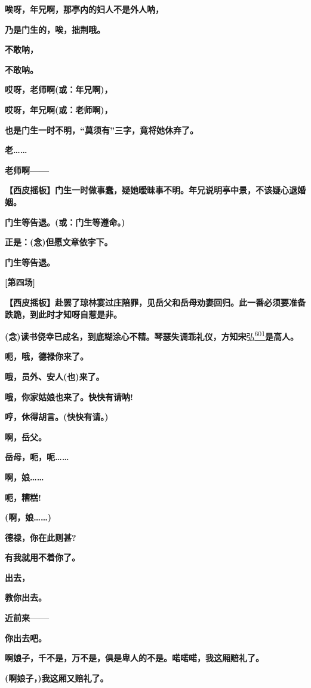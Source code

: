 \textbf{唉呀，年兄啊，那亭内的妇人不是外人呐，}

\textbf{乃是门生的，唉，拙荆哦。}

\textbf{不敢呐，}

\textbf{不敢呐。}

\textbf{哎呀，老师啊(或：年兄啊)，}

\textbf{哎呀，年兄啊(或：老师啊)，}

\textbf{也是门生一时不明，``莫须有''三字，竟将她休弃了。}

\textbf{老\ldots{}\ldots{}}

\textbf{老师啊------}

\textbf{【西皮摇板】门生一时做事蠢，疑她暧昧事不明。年兄说明亭中景，不该疑心退婚姻。}

\textbf{门生等告退。(或：门生等遵命。)}

\textbf{正是：(念)但愿文章依宇下。}

\textbf{门生等告退。}

\textbf{{[}第四场{]}}

\textbf{【西皮摇板】赴罢了琼林宴过庄陪罪，见岳父和岳母劝妻回归。此一番必须要准备跌跪，到此时才知呀自惹是非。}

\textbf{(念)读书侥幸已成名，到底糊涂心不精。琴瑟失调乖礼仪，方知宋}弘\protect\hyperlink{fn601}{\textsuperscript{601}}\textbf{是高人。}

\textbf{呃，哦，德禄你来了。}

\textbf{哦，员外、安人(也)来了。}

\textbf{哦，你家姑娘也来了。快快有请呐!}

\textbf{哼，休得胡言。(快快有请。)}

\textbf{啊，岳父。}

\textbf{岳母，呃，呃\ldots{}\ldots{}}

\textbf{啊，娘\ldots{}\ldots{}}

\textbf{呃，糟糕!}

\textbf{(啊，娘\ldots{}\ldots{})}

\textbf{德禄，你在此则甚?}

\textbf{有我就用不着你了。}

\textbf{出去，}

\textbf{教你出去。}

\textbf{近前来------}

\textbf{你出去吧。}

\textbf{啊娘子，千不是，万不是，俱是卑人的不是。喏喏喏，我这厢赔礼了。}

\textbf{(啊娘子，)我这厢又赔礼了。}

